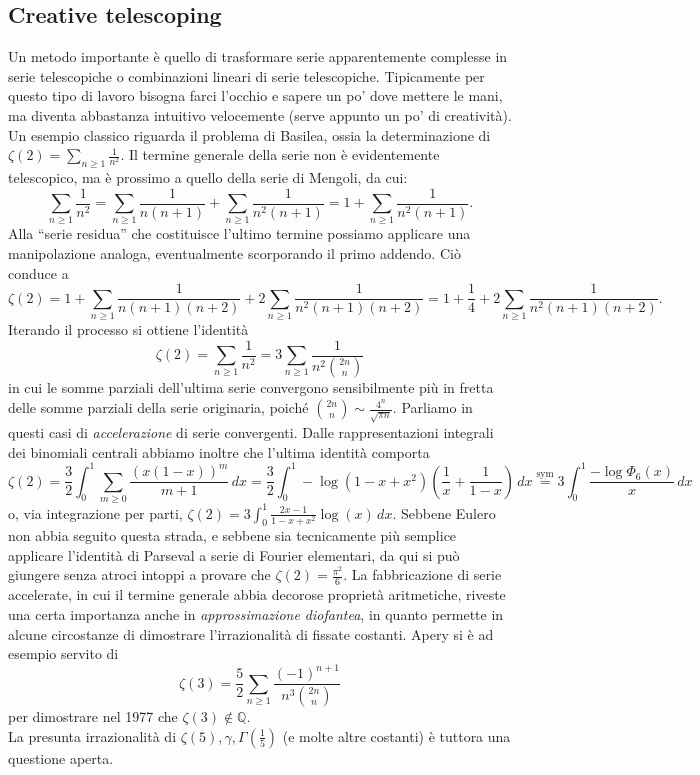 \documentclass[a4paper,twoside]{article}
\newcommand{\Q}{\mathbb{Q}}
\theoremstyle{definition}
\numberwithin{theorem}{section}
\begin{document}
\subsection{Creative telescoping}
Un metodo importante è quello di trasformare serie apparentemente complesse in serie telescopiche o combinazioni lineari di serie telescopiche.
Tipicamente per questo tipo di lavoro bisogna farci l'occhio e sapere un po' dove mettere le mani, ma diventa abbastanza intuitivo velocemente (serve appunto un po' di creatività). Un esempio classico riguarda il problema di Basilea, ossia la determinazione di $\zeta(2)=\sum_{n\geq 1}\frac{1}{n^2}$. Il termine generale della serie non è evidentemente telescopico, ma è prossimo a quello della serie di Mengoli, da cui:
$$ \sum_{n\geq 1}\frac{1}{n^2} = \sum_{n\geq 1}\frac{1}{n(n+1)}+\sum_{n\geq 1}\frac{1}{n^2(n+1)} = 1+\sum_{n\geq 1}\frac{1}{n^2(n+1)}. $$
Alla ``serie residua'' che costituisce l'ultimo termine possiamo applicare una manipolazione analoga, eventualmente scorporando il primo addendo. Ciò conduce a 
$$ \zeta(2) = 1+\sum_{n\geq 1}\frac{1}{n(n+1)(n+2)}+2\sum_{n\geq 1}\frac{1}{n^2(n+1)(n+2)} = 1+\frac{1}{4}+2\sum_{n\geq 1}\frac{1}{n^2(n+1)(n+2)}. $$
Iterando il processo si ottiene l'identità 
$$ \zeta(2)=\sum_{n\geq 1}\frac{1}{n^2} = 3\sum_{n\geq 1}\frac{1}{n^2\binom{2n}{n}}$$
in cui le somme parziali dell'ultima serie convergono sensibilmente più in fretta delle somme parziali della serie originaria, poiché $\binom{2n}{n}\sim \frac{4^n}{\sqrt{\pi n}}$. Parliamo in questi casi di \emph{accelerazione} di serie convergenti. Dalle rappresentazioni integrali dei binomiali centrali abbiamo inoltre che l'ultima identità comporta
$$ \zeta(2) = \frac{3}{2}\int_{0}^{1}\sum_{m\geq 0}\frac{(x(1-x))^{m}}{m+1}\,dx = \frac{3}{2}\int_{0}^{1}-\log(1-x+x^2)\left(\frac{1}{x}+\frac{1}{1-x}\right)\,dx \stackrel{\text{sym}}{=}3\int_{0}^{1}\frac{-\log\Phi_6(x)}{x}\,dx $$
o, via integrazione per parti, $\zeta(2)=3\int_{0}^{1}\frac{2x-1}{1-x+x^2}\log(x)\,dx$. Sebbene Eulero non abbia seguito questa strada, e sebbene sia tecnicamente più semplice applicare l'identità di Parseval a serie di Fourier elementari, da qui si può giungere senza atroci intoppi a provare che $\zeta(2)=\frac{\pi^2}{6}$. La fabbricazione di serie accelerate, in cui il termine generale abbia decorose proprietà aritmetiche, riveste una certa importanza anche in \emph{approssimazione diofantea}, in quanto permette in alcune circostanze di dimostrare l'irrazionalità di fissate costanti. Apery si è ad esempio servito di 
$$ \zeta(3) = \frac{5}{2}\sum_{n\geq 1}\frac{(-1)^{n+1}}{n^3\binom{2n}{n}} $$
per dimostrare nel 1977 che $\zeta(3)\not\in\Q$.\\ La presunta irrazionalità di $\zeta(5),\gamma,\Gamma\left(\frac{1}{5}\right)$ (e molte altre costanti) è tuttora una questione aperta.
\end{document}
